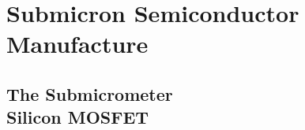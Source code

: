 \documentclass{WileySix}
\begin{document}










\part[Submicron Semiconductor Manufacture]
{Submicron Semiconductor\\ Manufacture}

\chapter[The Submicrometer Silicon MOSFET]
{The Submicrometer\\ Silicon MOSFET}

\end{document}
